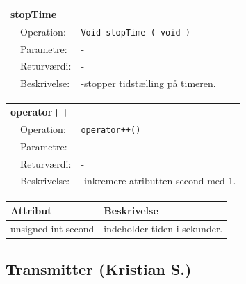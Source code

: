 \begin{table}[h]
\begin{tabularx}{\textwidth}{p{0.6 cm} l X} %
\multicolumn{3}{l}{\textbf{stopTime}}\\
& Operation: & %
\texttt{Void stopTime ( void )}
\\ & Parametre: & %
-
\\ & Returværdi: & %
- 
\\ & Beskrivelse: & %
-stopper tidstælling på timeren.
\\ \end{tabularx}
\end{table}


\begin{table}[h]
\begin{tabularx}{\textwidth}{p{0.6 cm} l X} %
\multicolumn{3}{l}{\textbf{operator++}}\\
& Operation: & %
\texttt{operator++()}
\\ & Parametre: & %
-
\\ & Returværdi: & %
- 
\\ & Beskrivelse: & %
-inkremere atributten second med 1.
\\ \end{tabularx}
\end{table}

\begin{table}[h]
\centering
\begin{tabularx}{13 cm}{|l |X|} \hline
Attribut & Beskrivelse \\ \hline
unsigned int second & indeholder tiden i sekunder. \\ \hline
\end{tabularx}
\end{table}

\clearpage

\subsection{Transmitter (Kristian S.)}

